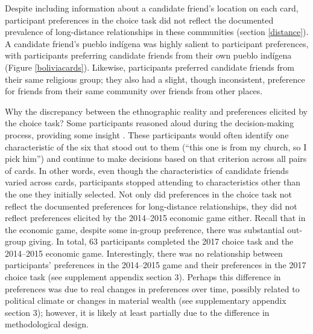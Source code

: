 \documentclass[bibauthoryear]{aa}
\begin{document}
	Despite including information about a candidate friend's location on each card, participant preferences in the choice task did not reflect the documented prevalence of long-distance relationships in these communities (section \ref{distance}). A candidate friend's pueblo ind\'igena was highly salient to participant preferences, with participants preferring candidate friends from their own pueblo ind\'igena (Figure \ref{boliviacards}). Likewise, participants preferred candidate friends from their same religious group; they also had a slight, though inconsistent, preference for friends from their same community over friends from other places. 
	
	Why the discrepancy between the ethnographic reality and preferences elicited by the choice task? Some participants reasoned aloud during the decision-making process, providing some insight \citep{bernard2017research}. These participants would often identify one characteristic of the six that stood out to them (``this one is from my church, so I pick him'') and continue to make decisions based on that criterion across all pairs of cards. In other words, even though the characteristics of candidate friends varied across cards, participants stopped attending to characteristics other than the one they initially  selected. Not only did preferences in the choice task not reflect the documented preferences for long-distance relationships,  they did not reflect preferences elicited by the 2014--2015 economic game either. Recall that in the economic game, despite some in-group preference, there was substantial out-group giving. In total, 63 participants completed the 2017 choice task and the 2014--2015 economic game. Interestingly, there was no relationship between participants' preferences in the 2014--2015 game and their preferences in the 2017 choice task (see supplement appendix section 3). Perhaps this difference in preferences was due to real changes in preferences over time, possibly related to political climate or changes in material wealth (see supplementary appendix section 3); however, it is likely at least partially due to the difference in methodological design.
	
\end{document}
